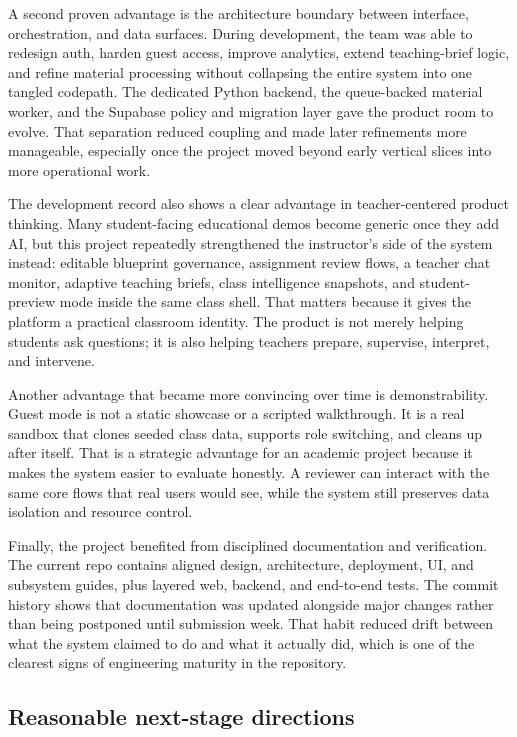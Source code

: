 \documentclass[11pt,a4paper]{article}
\begin{document}
A second proven advantage is the architecture boundary between interface, orchestration, and data
surfaces. During development, the team was able to redesign auth, harden guest access, improve
analytics, extend teaching-brief logic, and refine material processing without collapsing the entire
system into one tangled codepath. The dedicated Python backend, the queue-backed material worker,
and the Supabase policy and migration layer gave the product room to evolve. That separation reduced
coupling and made later refinements more manageable, especially once the project moved beyond early
vertical slices into more operational work.

The development record also shows a clear advantage in teacher-centered product thinking. Many
student-facing educational demos become generic once they add AI, but this project repeatedly
strengthened the instructor's side of the system instead: editable blueprint governance, assignment
review flows, a teacher chat monitor, adaptive teaching briefs, class intelligence snapshots, and
student-preview mode inside the same class shell. That matters because it gives the platform a
practical classroom identity. The product is not merely helping students ask questions; it is also
helping teachers prepare, supervise, interpret, and intervene.

Another advantage that became more convincing over time is demonstrability. Guest mode is not a
static showcase or a scripted walkthrough. It is a real sandbox that clones seeded class data,
supports role switching, and cleans up after itself. That is a strategic advantage for an academic
project because it makes the system easier to evaluate honestly. A reviewer can interact with the
same core flows that real users would see, while the system still preserves data isolation and
resource control.

Finally, the project benefited from disciplined documentation and verification. The current repo
contains aligned design, architecture, deployment, UI, and subsystem guides, plus layered web,
backend, and end-to-end tests. The commit history shows that documentation was updated alongside
major changes rather than being postponed until submission week. That habit reduced drift between
what the system claimed to do and what it actually did, which is one of the clearest signs of
engineering maturity in the repository.

\subsection{Reasonable next-stage directions}
\end{document}
